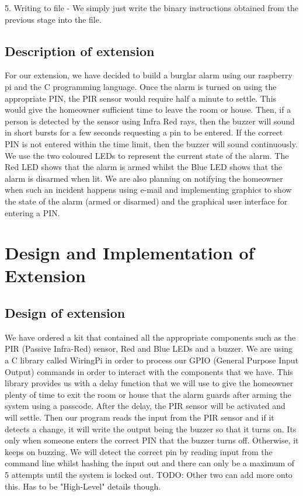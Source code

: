 \documentclass[11pt]{article}
\begin{document}
5. Writing to file - We simply just write the binary instructions obtained from the previous stage into the file.

\subsection{Description of extension}
For our extension, we have decided to build a burglar alarm using our raspberry pi and the C programming language.  Once the alarm is turned on using the appropriate PIN, the PIR sensor would require half a minute to settle. This would give the homeowner sufficient time to leave the room or house. Then, if a person is detected by the sensor using Infra Red rays, then the buzzer will sound in short bursts for a few seconds requesting a pin to be entered. If the correct PIN is not entered within the time limit, then the buzzer will sound continuously. We use the two coloured LEDs to represent the current state of the alarm. The Red LED shows that the alarm is armed whilst the Blue LED shows that the alarm is disarmed when lit. We are also planning on notifying the homeowner when such an incident happens using e-mail and implementing graphics to show the state of the alarm (armed or disarmed) and the graphical user interface for entering a PIN. 

\section{Design and Implementation of Extension}

\subsection{Design of extension}
We have ordered a kit that contained all the appropriate components such as the PIR (Passive Infra-Red) sensor, Red and Blue LEDs and a buzzer. We are using a C library called WiringPi in order to process our GPIO (General Purpose Input Output) commands in order to interact with the components that we have.  This library provides us with a delay function that we will use to give the homeowner plenty of time to exit the room or house that the alarm guards after arming the system using a passcode. After the delay, the PIR sensor will be activated and will settle. Then our program reads the input from the PIR sensor and if it detects a change, it will write the output being the buzzer so that it turns on. Its only when someone enters the correct PIN that the buzzer turns off. Otherwise, it keeps on buzzing. We will detect the correct pin by reading input from the command line whilst hashing the input out and there can only be a maximum of 5 attempts until the system is locked out. 
TODO: Other two can add more onto this. Has to be "High-Level" details though.
\end{document}
